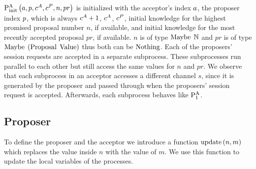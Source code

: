 $\operatorname{P^{A}_{init}}\left(a, p, c^A, c^P, n, pr\right)$ is initialized with the acceptor's index $a$, the proposer index $p$, which is always $c^A + 1$, $c^A$, $c^P$, initial knowledge for the highest promised proposal number $n$, if available, and initial knowledge for the most recently accepted proposal $pr$, if available.
$n$ is of type $\operatorname{Maybe}\; \mathbb{N}$ and $pr$ is of type $\operatorname{Maybe}\; \left(\operatorname{Proposal}\; \operatorname{Value}\right)$ thus both can be $\operatorname{Nothing}$.
Each of the proposers' session requests are accepted in a separate subprocess.
These subprocesses run parallel to each other but still access the same values for $n$ and $pr$.
We observe that each subprocess in an acceptor accesses a different channel $s$, since it is generated by the proposer and passed through when the proposers' session request is accepted.
Afterwards, each subprocess behaves like $\operatorname{P^{A}_{1}}$.

\subsection{Proposer}
To define the proposer and the acceptor we introduce a function $\operatorname{update} \left(n, m\right)$ which replaces the value inside $n$ with the value of $m$.
We use this function to update the local variables of the processes.


